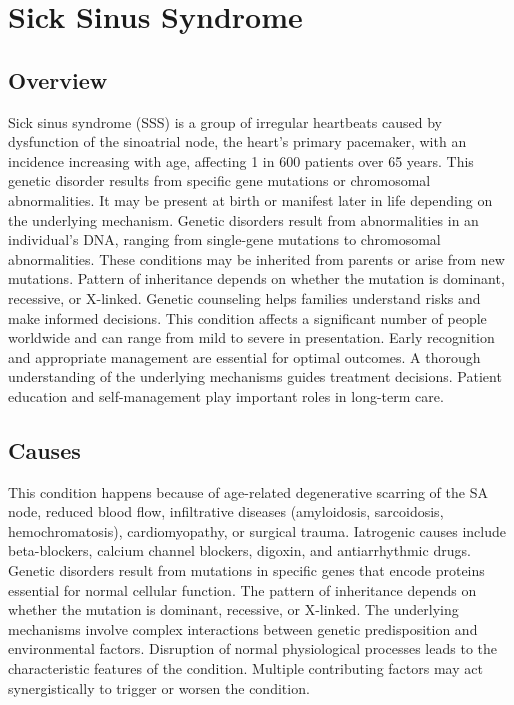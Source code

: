 \chapter{Sick Sinus Syndrome}
\label{sec:Sick Sinus Syndrome}

\section{Overview}
Sick sinus syndrome (SSS) is a group of irregular heartbeats caused by dysfunction of the sinoatrial node, the heart's primary pacemaker, with an incidence increasing with age, affecting 1 in 600 patients over 65 years. This genetic disorder results from specific gene mutations or chromosomal abnormalities. It may be present at birth or manifest later in life depending on the underlying mechanism. Genetic disorders result from abnormalities in an individual's DNA, ranging from single-gene mutations to chromosomal abnormalities. These conditions may be inherited from parents or arise from new mutations. Pattern of inheritance depends on whether the mutation is dominant, recessive, or X-linked. Genetic counseling helps families understand risks and make informed decisions. This condition affects a significant number of people worldwide and can range from mild to severe in presentation. Early recognition and appropriate management are essential for optimal outcomes. A thorough understanding of the underlying mechanisms guides treatment decisions. Patient education and self-management play important roles in long-term care.
\section{Causes}
This condition happens because of age-related degenerative scarring of the SA node, reduced blood flow, infiltrative diseases (amyloidosis, sarcoidosis, hemochromatosis), cardiomyopathy, or surgical trauma. Iatrogenic causes include beta-blockers, calcium channel blockers, digoxin, and antiarrhythmic drugs. Genetic disorders result from mutations in specific genes that encode proteins essential for normal cellular function. The pattern of inheritance depends on whether the mutation is dominant, recessive, or X-linked. The underlying mechanisms involve complex interactions between genetic predisposition and environmental factors. Disruption of normal physiological processes leads to the characteristic features of the condition. Multiple contributing factors may act synergistically to trigger or worsen the condition.
